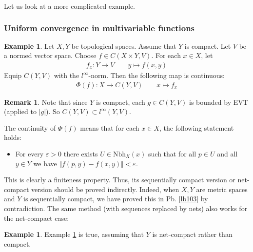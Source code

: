 \documentclass[12pt,b5paper,notitlepage]{article}
\theoremstyle{definition}
\newtheorem{eg}[df]{Example}
\newtheorem{rem}[df]{Remark}
\theoremstyle{plain}
\newcommand{\Nbh}{\mathrm{Nbh}}
\newcommand{\eps}{\varepsilon}
\numberwithin{equation}{section}
\begin{document}
Let us look at a more complicated example.













\subsubsection{Uniform convergence in multivariable functions}\label{lb271}


\begin{eg}\label{lb225}
Let $X,Y$ be topological spaces. Assume that $Y$ is compact. Let $V$ be a normed vector space. Choose $f\in C(X\times Y,V)$. For each $x\in X$, let
\begin{align*}
f_x:Y\rightarrow V\qquad y\mapsto f(x,y)
\end{align*}
Equip $C(Y,V)$ with the $l^\infty$-norm. Then the following map is continuous:
\begin{align}
\Phi(f):X\rightarrow C(Y,V)\qquad x\mapsto f_x
\end{align}
\end{eg}



\begin{rem}
Note that since $Y$ is compact, each $g\in C(Y,V)$ is bounded by EVT (applied to $|g|$). So $C(Y,V)\subset l^\infty(Y,V)$.
\end{rem}


The continuity of $\Phi(f)$ means that for each $x\in X$, the following statement holds:
\begin{itemize}
\item[\textleaf] For every $\eps>0$ there exists $U\in\Nbh_X(x)$ such that for all $p\in U$ and all $y\in Y$ we have $\Vert f(p,y)-f(x,y)\Vert<\eps$.
\end{itemize}
This is clearly a finiteness property. Thus, its sequentially compact version or net-compact version should be proved indirectly. Indeed, when $X,Y$ are metric spaces and $Y$ is sequentially compact, we have proved this in Pb. \ref{lb103} by contradiction. The same method (with sequences replaced by nets) also works for the net-compact case:

\begin{eg}
Example \ref{lb225} is true, assuming that $Y$ is net-compact rather than compact.
\end{eg}
\end{document}
